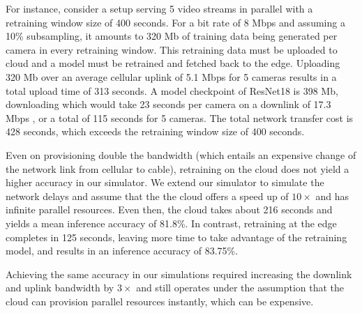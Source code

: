 
For instance, consider a setup serving 5 video streams in parallel with a retraining window size of 400 seconds. For a bit rate of 8 Mbps \cite{bitrate} and assuming a 10\% subsampling, it amounts to 320 Mb of training data being generated per camera in every retraining window. This retraining data must be uploaded to cloud and a model must be retrained and fetched back to the edge. Uploading 320 Mb over an average cellular uplink of 5.1 Mbps \cite{opensignal_2018} for 5 cameras results in a total upload time of 313 seconds. A model checkpoint of ResNet18 is 398 Mb, downloading which would take 23 seconds per camera on a downlink of 17.3 Mbps \cite{opensignal_2018}, or a total of 115 seconds for 5 cameras. The total network transfer cost is 428 seconds, which exceeds the retraining window size of 400 seconds. 


Even on provisioning double the bandwidth (which entails an expensive change of the network link from cellular to cable), retraining on the cloud does not yield a higher accuracy in our simulator. We extend our simulator to simulate the network delays and assume that the the cloud offers a speed up of $10\times$ and has infinite parallel resources. Even then, the cloud  takes about 216 seconds and yields a mean inference accuracy of 81.8\%. In contrast, retraining at the edge completes in 125 seconds, leaving more time to take advantage of the retraining model, and results in an inference accuracy of 83.75\%.

Achieving the same accuracy in our simulations required increasing the downlink and uplink bandwidth by $3\times$ and still operates under the assumption that the cloud can provision parallel resources instantly, which can be expensive.


